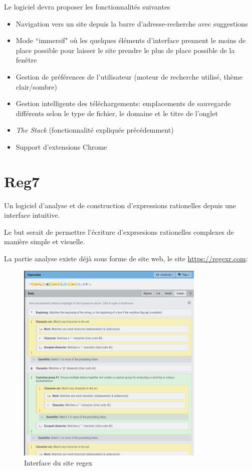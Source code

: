 \documentclass{article}
\begin{document}
Le logiciel devra proposer les fonctionnalités suivantes

\begin{itemize}
    \item Navigation vers un site depuis la barre d'adresse-recherche avec suggestions
    \item Mode ``immersif" où les quelques éléments d'interface prennent le moins de place possible pour laisser le site prendre le plus de place possible de la fenêtre
    \item Gestion de préférences de l'utilisateur (moteur de recherche utilisé, thème clair/sombre)
    \item Gestion intelligente des téléchargements: emplacements de sauvegarde différents selon le type de fichier, le domaine et le titre de l'onglet
    \item \emph{The Stack} (fonctionnalité expliquée précédemment)
    \item Support d'extensions Chrome
\end{itemize}

\newpage


\newpage

\section{Reg7}

Un logiciel d'analyse et de construction d'expressions rationelles depuis une interface intuitive.

Le but serait de permettre l'écriture d'exprsesions rationelles complexes de manière simple et visuelle.

La partie analyse existe déjà sous forme de site web, le site \url{https://regexr.com}:

\begin{figure}[H]
    \centering
    \includegraphics[width=0.8\textwidth]{regexr.com.png}
    \caption{Interface du site regex}
    \label{fig:reg7:regexr}
\end{figure}
\end{document}
